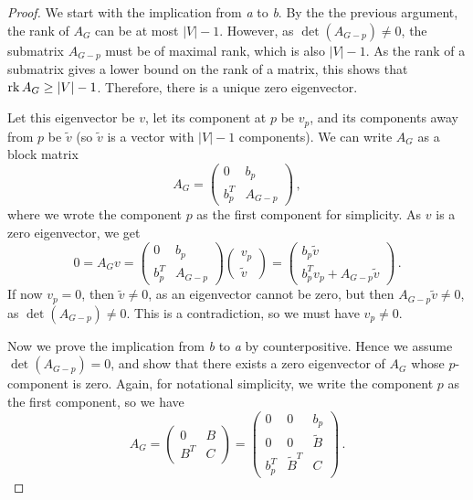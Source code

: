 \begin{proof}
We start with the implication from \emph{a} to \emph{b}.
By the the previous argument, the rank of $ A_G $ can be at most $ |V|-1 $. However, as $\det (A_{G-p}) \neq 0$, the submatrix $A_{G-p}$ must be of maximal rank, which is also $ |V|-1$. As the rank of a submatrix gives a lower bound on the rank of a matrix, this shows that $ \operatorname{rk} A_G \geq |V|-1$. Therefore, there is a unique zero eigenvector.\par
Let this eigenvector be $v$, let its component at $p$ be $v_p$, and its components away from $p$ be $\tilde{v}$ (so $\tilde{v} $ is a vector with $|V|-1$ components). We can write $A_G $ as a block matrix
\begin{equation*}
  A_G = \begin{pmatrix} 0 & b_p \\ b_p^T & A_{G-p} \end{pmatrix} \,, 
\end{equation*}
where we wrote the component $p$ as the first component for simplicity. As $v$ is a zero eigenvector, we get
\begin{equation*}
    0 = A_G v = \begin{pmatrix} 0 & b_p \\ b_p^T & A_{G-p} \end{pmatrix} \begin{pmatrix} v_p \\ \tilde{v}\end{pmatrix} = \begin{pmatrix} b_p \tilde{v} \\ b^T_p v_p + A_{G-p} \tilde{v} \end{pmatrix}\,.
\end{equation*}
If now $ v_p =0$, then $ \tilde{v} \neq 0$, as an eigenvector cannot be zero, but then $A_{G-p}\tilde{v} \neq 0$, as $\det (A_{G-p}) \neq 0$. This is a contradiction, so we must have $ v_p \neq 0$.\par
Now we prove the implication from \emph{b} to \emph{a} by counterpositive. Hence we assume $\det (A_{G-p})=0$, and show that there exists a zero eigenvector of $A_G$ whose $p$-component is zero. Again, for notational simplicity, we write the component $p$ as the first component, so we have
\begin{equation*}
    A_{G} = \begin{pmatrix} 0 & B \\ B^T & C\end{pmatrix} = \begin{pmatrix} 0&0 & b_p \\ 0 & 0 & \tilde{B} \\ b_p^T & \tilde{B}^T & C \end{pmatrix}\,.

\end{equation*}
\end{proof}

